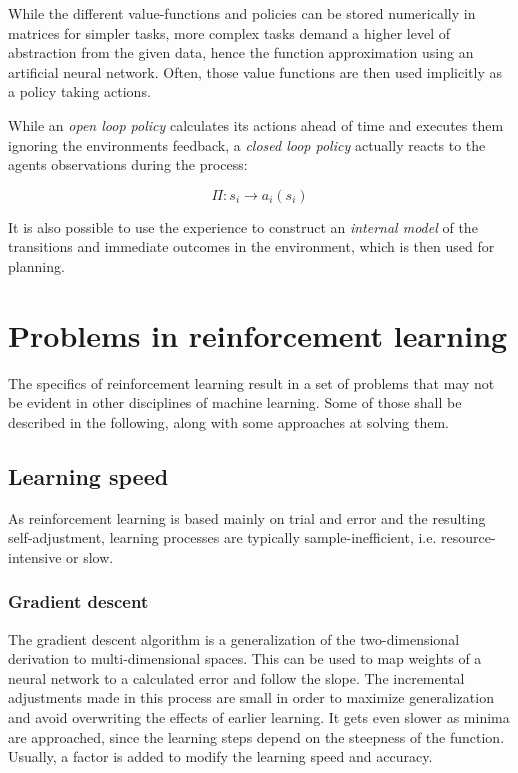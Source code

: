 \documentclass[12pt,a4]{article}
\begin{document}
While the different value-functions and policies can be stored numerically in matrices for simpler tasks, more complex tasks demand a higher level of abstraction from the given data, hence the function approximation using an artificial neural network.\citep{DSilver} \newline
Often, those value functions are then used implicitly as a policy taking actions.

While an \emph{open loop policy} calculates its actions ahead of time and executes them ignoring the environments feedback, a \emph{closed loop policy} actually reacts to the agents observations during the process:

\[\Pi :s_{i} \rightarrow a_{i}(s_{i})\]

 
It is also possible to use the experience to construct an \emph{internal model} of the transitions and immediate outcomes in the environment, which is then used for planning.


\section{Problems in reinforcement learning}
The specifics of reinforcement learning result in a set of problems that may not be evident in other disciplines of machine learning. Some of those shall be described in the following, along with some approaches at solving them.

\subsection{Learning speed}
As reinforcement learning is based mainly on trial and error and the resulting self-adjustment, learning processes are typically sample-inefficient, i.e. resource-intensive or slow.

\subsubsection{Gradient descent}
The gradient descent algorithm is a generalization of the two-dimensional derivation to multi-dimensional spaces. This can be used to map weights of a neural network to a calculated error and follow the slope. The incremental adjustments made in this process are small in order to maximize generalization and avoid overwriting the effects of earlier learning. It gets even slower as minima are approached, since the learning steps depend on the steepness of the function. Usually, a factor is added to modify the learning speed and accuracy.
\end{document}
